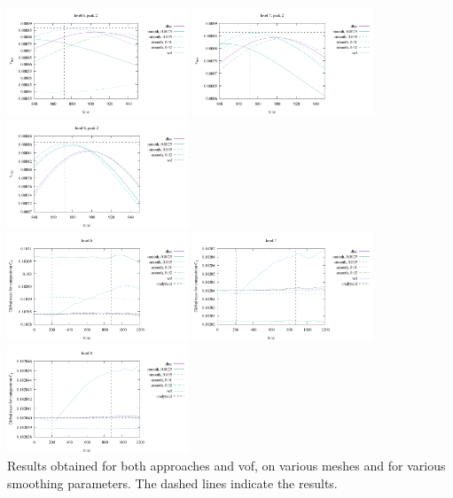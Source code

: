 \begin{itemize}
\begin{center}
\includegraphics[width=5.4cm]{images/benchmark_vaks97/vrms6_peak2}
\includegraphics[width=5.4cm]{images/benchmark_vaks97/vrms7_peak2}
\includegraphics[width=5.4cm]{images/benchmark_vaks97/vrms8_peak2}\\
\includegraphics[width=5.4cm]{images/benchmark_vaks97/C1_6}
\includegraphics[width=5.4cm]{images/benchmark_vaks97/C1_7}
\includegraphics[width=5.4cm]{images/benchmark_vaks97/C1_8}\\
{\captionfont Results obtained for both approaches and vof, on various meshes and for 
various smoothing parameters. The dashed lines indicate the  results.}
\end{center}



\end{itemize}

